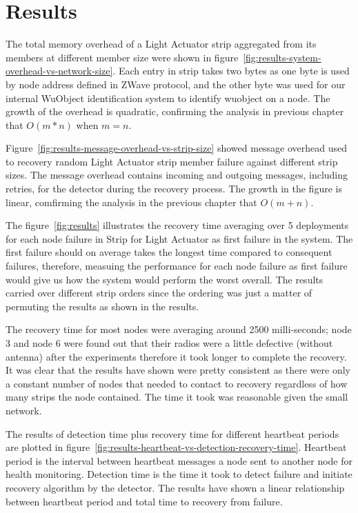 \section{Results}
\label{s:results}

The total memory overhead of a Light Actuator strip aggregated from its members
at different member size were shown in
figure~\ref{fig:results-system-overhead-vs-network-size}. Each entry in strip
takes two bytes as one byte is used by node address defined in ZWave protocol,
and the other byte was used for our internal WuObject identification system to
identify wuobject on a node. The growth of the overhead is quadratic, confirming
the analysis in previous chapter that $O(m*n)$ when $m = n$. 

Figure~\ref{fig:results-message-overhead-vs-strip-size} showed message overhead
used to recovery random Light Actuator strip member failure against different
strip sizes. The message overhead contains incoming and outgoing messages,
including retries, for the detector during the recovery process. The growth in
the figure is linear, comfirming the analysis in the previous chapter that $O(m+n)$.

The figure~\ref{fig:results} illustrates the recovery time averaging over
5 deployments for each node failure in Strip for Light Actuator as first failure
in the system. The first failure should on average takes the longest time
compared to consequent failures, therefore, measuing the performance for each
node failure as first failure would give us how the system would perform the
worst overall. The results carried over different strip orders since the
ordering was just a matter of permuting the results as shown in the results.

The recovery time for most nodes were averaging around 2500 milli-seconds; node
3 and node 6 were found out that their radios were a little defective (without
antenna) after the experiments therefore it took longer to complete the
recovery. It was clear that the results have shown were pretty consistent as
there were only a constant number of nodes that needed to contact to recovery
regardless of how many strips the node contained. The time it took was
reasonable given the small network. 

The results of detection time plus recovery time for different heartbeat
periods are plotted
in figure~\ref{fig:results-heartbeat-vs-detection-recovery-time}. Heartbeat
period is the interval between heartbeat messages a node sent to
another node for health monitoring. Detection time is the time it took to detect
failure and initiate recovery algorithm by the detector.
The results have shown a linear relationship between heartbeat
period and total time to recovery from failure. 


